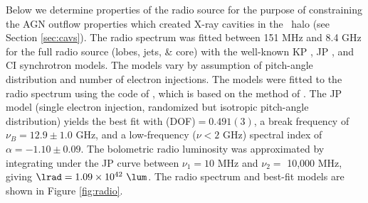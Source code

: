 \documentclass[useAMS,usenatbib]{mn2e}
\begin{document}
Below we determine properties of the radio source for the purpose of
constraining the AGN outflow properties which created X-ray cavities
in the \rxj\ halo (see Section \ref{sec:cavs}). The radio spectrum was
fitted between 151 MHz and 8.4 GHz for the full radio source (lobes,
jets, \& core) with the well-known KP \citep{1962SvA.....6..317K,
  pach}, JP \citep{1973A&A....26..423J}, and CI
\citep{1987MNRAS.225..335H} synchrotron models. The models vary by
assumption of pitch-angle distribution and number of electron
injections. The models were fitted to the radio spectrum using the
code of \citet{2005ApJ...624..656W}, which is based on the method of
\citet{1991ApJ...383..554C}. The JP model (single electron injection,
randomized but isotropic pitch-angle distribution) yields the best fit
with \chisq(DOF)$ = 0.491(3)$, a break frequency of $\nu_B = 12.9 \pm
1.0$ GHz, and a low-frequency ($\nu < 2$ GHz) spectral index of
$\alpha = -1.10 \pm 0.09$. The bolometric radio luminosity was
approximated by integrating under the JP curve between $\nu_1 = 10$
MHz and $\nu_2 =$ 10,000 MHz, giving $\lrad = 1.09 \times
10^{42}~\lum$. The radio spectrum and best-fit models are shown in
Figure \ref{fig:radio}.
\end{document}

